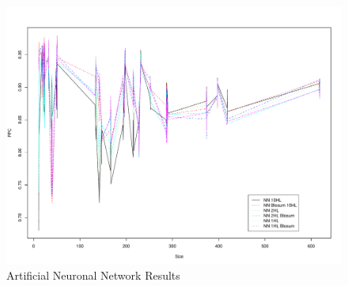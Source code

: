 \begin{figure}
\begin{center}
\includegraphics[width=12cm]{fig/ann1.pdf}
\caption{Artificial Neuronal Network Results}\label{fig:ann1}
\end{center}
\end{figure}

